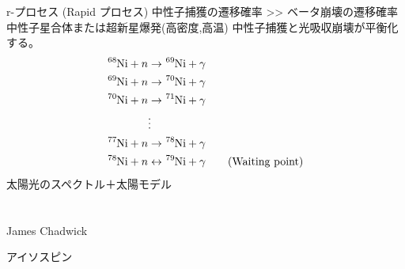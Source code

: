 \documentclass[uplatex,dvipdfmx,a4paper,11pt]{jlreq}
\numberwithin{equation}{section}
\theoremstyle{definition}
\begin{document}
r-プロセス (Rapid プロセス)
中性子捕獲の遷移確率 >> ベータ崩壊の遷移確率
中性子星合体または超新星爆発(高密度,高温)
中性子捕獲と光吸収崩壊が平衡化する。
\begin{align}
  \ce{^68Ni} + n & \to \ce{^69Ni} + \gamma                                             \\
  \ce{^69Ni} + n & \to \ce{^70Ni} + \gamma                                             \\
  \ce{^70Ni} + n & \to \ce{^71Ni} + \gamma                                             \\
                 & \vdots                                                              \\
  \ce{^77Ni} + n & \to \ce{^78Ni} + \gamma                                             \\
  \ce{^78Ni} + n & \leftrightarrow \ce{^79Ni} + \gamma \qquad (\textrm{Waiting point})
\end{align}
太陽光のスペクトル＋太陽モデル

\section{}


James Chadwick


アイソスピン
\end{document}
